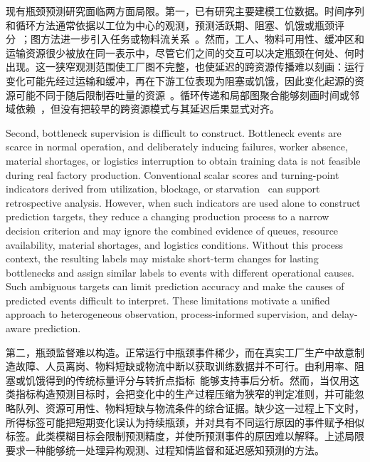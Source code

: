 \documentclass[a4paper,fleqn]{cas-dc}
\newcommand{\zhpara}[1]{%
  \par\begingroup\small\color{black!72}\noindent #1\par\endgroup}
\begin{document}
\zhpara{现有瓶颈预测研究面临两方面局限。第一，已有研究主要建模工位数据。时间序列和循环方法通常依据以工位为中心的观测，预测活跃期、阻塞、饥饿或瓶颈评分~\cite{li2011throughput,subramaniyan2018data,lai2018twolayer,liu2023lstmdam}；图方法进一步引入任务或物料流关系~\cite{lai2023bstan,yin2025btgcn,ma2023tusb,cen2025dstnn,wu2025knowledge}。然而，工人、物料可用性、缓冲区和运输资源很少被放在同一表示中，尽管它们之间的交互可以决定瓶颈在何处、何时出现。这一狭窄观测范围使工厂图不完整，也使延迟的跨资源传播难以刻画：运行变化可能先经过运输和缓冲，再在下游工位表现为阻塞或饥饿，因此变化起源的资源可能不同于随后限制吞吐量的资源~\cite{gu2015passive,zhang2022vulnerability}。循环传递和局部图聚合能够刻画时间或邻域依赖~\cite{liu2023lstmdam,yin2025btgcn}，但没有把较早的跨资源模式与其延迟后果显式对齐。}


Second, bottleneck supervision is difficult to construct. Bottleneck events are scarce in normal operation, and deliberately inducing failures, worker absence, material shortages, or logistics interruption to obtain training data is not feasible during real factory production. Conventional scalar scores and turning-point indicators derived from utilization, blockage, or starvation~\cite{subramaniyan2023throughput,lai2021data,su2022dynamic} can support retrospective analysis. However, when such indicators are used alone to construct prediction targets, they reduce a changing production process to a narrow decision criterion and may ignore the combined evidence of queues, resource availability, material shortages, and logistics conditions. Without this process context, the resulting labels may mistake short-term changes for lasting bottlenecks and assign similar labels to events with different operational causes. Such ambiguous targets can limit prediction accuracy and make the causes of predicted events difficult to interpret. These limitations motivate a unified approach to heterogeneous observation, process-informed supervision, and delay-aware prediction.

\zhpara{第二，瓶颈监督难以构造。正常运行中瓶颈事件稀少，而在真实工厂生产中故意制造故障、人员离岗、物料短缺或物流中断以获取训练数据并不可行。由利用率、阻塞或饥饿得到的传统标量评分与转折点指标~\cite{subramaniyan2023throughput,lai2021data,su2022dynamic}能够支持事后分析。然而，当仅用这类指标构造预测目标时，会把变化中的生产过程压缩为狭窄的判定准则，并可能忽略队列、资源可用性、物料短缺与物流条件的综合证据。缺少这一过程上下文时，所得标签可能把短期变化误认为持续瓶颈，并对具有不同运行原因的事件赋予相似标签。此类模糊目标会限制预测精度，并使所预测事件的原因难以解释。上述局限要求一种能够统一处理异构观测、过程知情监督和延迟感知预测的方法。}
\end{document}
